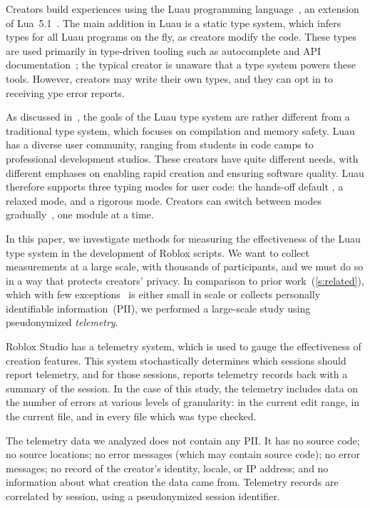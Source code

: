\documentclass[english,submission,cleveref]{programming}
\begin{document}
Creators build experiences using the
{Luau} programming language~\cite{luau-lang.org},
an extension of {Lua~5.1~\cite{lua}}.
The main addition in Luau is a static type system, which infers
types for all Luau programs on the fly, as creators modify the code.
These types are used primarily in type-driven tooling such as autocomplete and
API documentation~\cite{luau-autocomplete}; the typical creator is unaware
that a type system powers these tools.
However, creators may write their own types, and they can opt in
to receiving ype error reports.

As discussed in~\cite{bfj-hatra-2021},
the goals of the {Luau} type system are rather different from
a traditional type system, which focuses on compilation and memory safety.
{Luau} has a diverse user community, ranging from
students in code camps to professional development studios. These
creators have quite different needs, with different emphases on
enabling rapid creation and ensuring software quality.
{Luau} therefore supports three typing modes for user code:
the hands-off default \mnocheck{},
a relaxed \mnonstrict{} mode,
and a rigorous \mstrict{} mode.
Creators can switch between modes
gradually~\cite{st-sfp-2006,tfffgksst-snapl-2017}, one module at a time.

In this paper, we investigate methods for measuring the effectiveness
of the {Luau} type system in the development of {Roblox} scripts.
We want to collect measurements at a large scale, with thousands
of participants, and we must do so in a way that protects creators' privacy.
In comparison to prior work~(\cref{s:related}), which
with few exceptions~\cite{zhlbr-cc-2020,zhlbr-oopsla-2020,hlzbr-ecoop-2021} is either small in scale
or collects personally identifiable information~(PII),
we performed a large-scale study using pseudonymized \emph{telemetry}.

{Roblox Studio} has a telemetry system, which is used to gauge
the effectiveness of creation features. This system stochastically
determines which sessions should report telemetry, and for those
sessions, reports telemetry records back with a summary of the
session. In the case of this study, the telemetry includes data on the
number of errors at various levels of granularity: in the current edit
range, in the current file, and in every file which was type
checked.

The telemetry data we analyzed does not contain any PII.
It has no source code;
 no source locations;
no error messages (which may contain source code);
no error messages;
no record of the creator's identity, locale, or IP address;
and no information about what creation the data came from.
Telemetry records are correlated by session, using a pseudonymized
session identifier.
\end{document}
